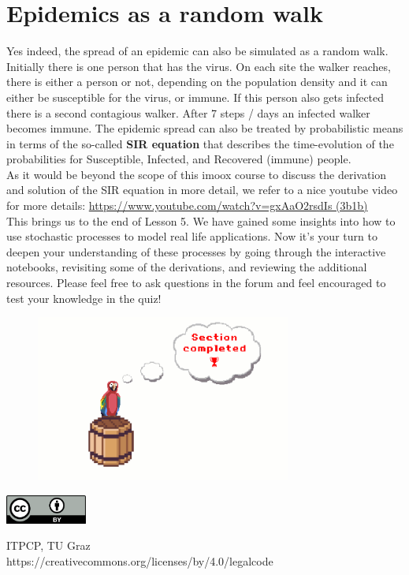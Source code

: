 \documentclass[12pt, a4paper]{scrartcl}
\begin{document}
\section*{Epidemics as a random walk}
Yes indeed, the spread of an epidemic can also be simulated as a random walk.
Initially there is one person that has the virus.
On each site the walker reaches, there is either a person or not, depending on the population density and it can either be susceptible for the virus, or immune. If this person also gets infected there is a second contagious walker. After 7 steps / days an infected walker becomes immune.
The epidemic spread can also be treated by probabilistic means in terms of the so-called \textbf{SIR equation} that describes the time-evolution of the probabilities for Susceptible, Infected, and Recovered (immune) people.  \\
As it would be beyond the scope of this imoox course to discuss the derivation and solution of the SIR equation in more detail, we refer to a nice youtube video for more details:
\url{https://www.youtube.com/watch?v=gxAaO2rsdIs (3b1b)}\\


This brings us to the end of Lesson 5.
We have gained some insights into how to use stochastic processes to model real life applications. Now it's your turn to deepen your understanding of these processes by going through the interactive notebooks, revisiting some of the derivations, and reviewing the additional resources. 
Please feel free to ask questions in the forum and feel encouraged to test your knowledge in the quiz!
 \begin{figure}[H]
	\centering
	\includegraphics[width=0.75\textwidth]{5_14.png}
\end{figure}



\vspace{2cm}
\begin{minipage}[t]{1\textwidth}
	\raggedleft
	\centering
	\includegraphics[width = 0.20\textwidth]{CC-BY_icon}
	\vspace{0.2cm}
	
	\centering
	{\large ITPCP, TU Graz} \\
	https://creativecommons.org/licenses/by/4.0/legalcode
\end{minipage}
\end{document}
